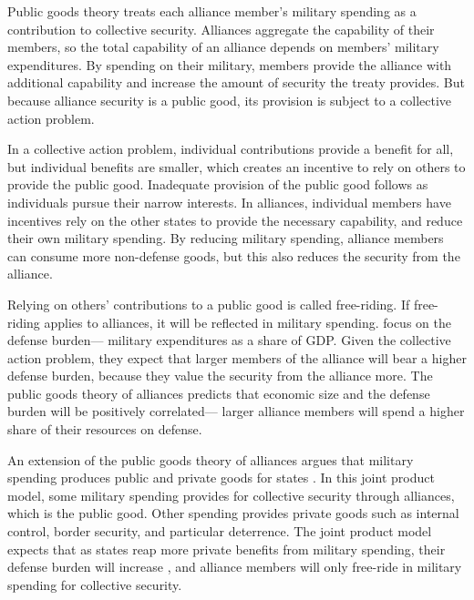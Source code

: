\documentclass[12pt]{article}
\begin{document}
Public goods theory treats each alliance member's military spending as a contribution to collective security. 
Alliances aggregate the capability of their members, so the total capability of an alliance depends on members' military expenditures. 
By spending on their military, members provide the alliance with additional capability and increase the amount of security the treaty provides. 
But because alliance security is a public good, its provision is subject to a collective action problem. 

In a collective action problem, individual contributions provide a benefit for all, but individual benefits are smaller, which creates an incentive to rely on others to provide the public good.
Inadequate provision of the public good follows as individuals pursue their narrow interests. 
In alliances, individual members have incentives rely on the other states to provide the necessary capability, and reduce their own military spending. 
By reducing military spending, alliance members can consume more non-defense goods, but this also reduces the security from the alliance.


Relying on others' contributions to a public good is called free-riding.
If free-riding applies to alliances, it will be reflected in military spending.  
\citet{OlsonZeckhauser1966} focus on the defense burden--- military expenditures as a share of GDP. 
Given the collective action problem, they expect that larger members of the alliance will bear a higher defense burden, because they value the security from the alliance more. 
The public goods theory of alliances predicts that economic size and the defense burden will be positively correlated--- larger alliance members will spend a higher share of their resources on defense. 


An extension of the public goods theory of alliances argues that military spending produces public and private goods for states \citep{Hansenetal1990, Murdoch1995}. 
In this joint product model, some military spending provides for collective security through alliances, which is the public good. 
Other spending provides private goods such as internal control, border security, and particular deterrence. 
The joint product model expects that as states reap more private benefits from military spending, their defense burden will increase \citep{SandlerHartley2001}, and alliance members will only free-ride in military spending for collective security. 
\end{document}
